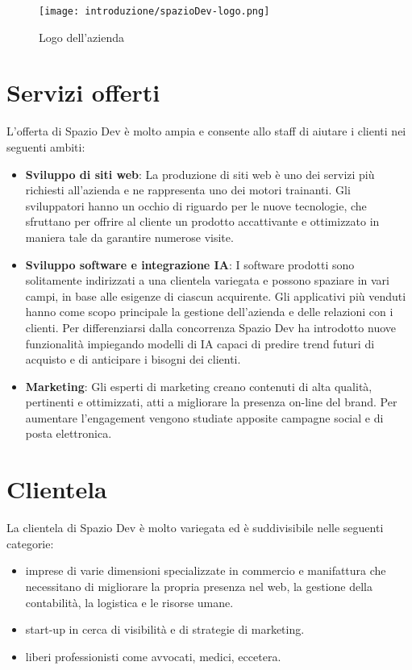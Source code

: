 \begin{figure}[!h] 
  \centering 
  \texttt{[image: introduzione/spazioDev-logo.png]} 
  \caption{Logo dell'azienda}
  \label{fig:logo-spaziodev}
\end{figure}

\newpage

\section{Servizi offerti}
L'offerta di Spazio Dev è molto ampia e consente allo staff di aiutare i clienti nei seguenti ambiti:
\begin{itemize}
  \item \textbf{Sviluppo di siti web}: La produzione di siti web è uno dei servizi più richiesti all'azienda e ne rappresenta uno dei motori trainanti. Gli sviluppatori hanno un occhio di riguardo per le nuove tecnologie, che sfruttano per offrire al cliente un prodotto accattivante e ottimizzato in maniera tale da garantire numerose visite.
  \item \textbf{Sviluppo software e integrazione IA}: I software prodotti sono solitamente indirizzati a una clientela variegata e possono spaziare in vari campi, in base alle esigenze di ciascun acquirente. Gli applicativi più venduti hanno come scopo principale la gestione dell'azienda e delle relazioni con i clienti. Per differenziarsi dalla concorrenza Spazio Dev ha introdotto nuove funzionalità impiegando modelli di IA capaci di predire trend futuri di acquisto e  di anticipare i bisogni dei clienti.
  \item \textbf{Marketing}: Gli esperti di marketing creano contenuti di alta qualità, pertinenti e ottimizzati, atti a migliorare la presenza on-line del brand. Per aumentare l'engagement vengono studiate apposite campagne social e di posta elettronica.
\end{itemize}

\section{Clientela}
La clientela di Spazio Dev è molto variegata ed è suddivisibile nelle seguenti categorie:
\begin{itemize}
  \item imprese di varie dimensioni specializzate in commercio e manifattura che necessitano di migliorare la propria presenza nel web, la gestione della contabilità, la logistica e le risorse umane.
  \item start-up in cerca di visibilità e di strategie di marketing.
  \item liberi professionisti come avvocati, medici, eccetera.
\end{itemize}

